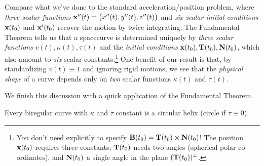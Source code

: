
Compare what we've done to the standard acceleration/position problem, where \emph{three scalar functions} ${\mathbf{x}}''(t)=\bigl(x''(t),y''(t),z''(t)\bigr)$ and \emph{six scalar initial conditions} ${\mathbf{x}}(t_0)$ and ${\mathbf{x}}'(t_0)$ recover the motion by twice integrating.\smallbreak
The Fundamental Theorem tells us that a spacecurve is determined uniquely by \emph{three scalar functions} $v(t),\kappa(t),\tau(t)$ and the \emph{initial conditions} ${\mathbf{x}}(t_0),{\mathbf{T}}(t_0),{\mathbf{N}}(t_0)$, which also amount to \emph{six} scalar constants.\footnote{You don't need explicitly to specify ${\mathbf{B}}(t_0)={\mathbf{T}}(t_0)\times{\mathbf{N}}(t_0)$! The position ${\mathbf{x}}(t_0)$ requires three constants; ${\mathbf{T}}(t_0)$ needs two angles (spherical polar co-ordinates), and ${\mathbf{N}}(t_0)$ a single angle in the plane $({\mathbf{T}}(t_0))^\perp$.}\smallbreak
One benefit of our result is that, by standardizing $v(t)\equiv 1$ and ignoring rigid motions, we see that the \emph{physical shape} of a curve depends only on \emph{two} scalar functions $\kappa(t)$ and $\tau(t)$.\bigbreak



\goodbreak

We finish this discussion with a quick application of the Fundamental Theorem.

\begin{cor}{}{}
Every biregular curve with $\kappa$ and $\tau$ constant is a circular helix (circle if $\tau\equiv 0$).
\end{cor}

